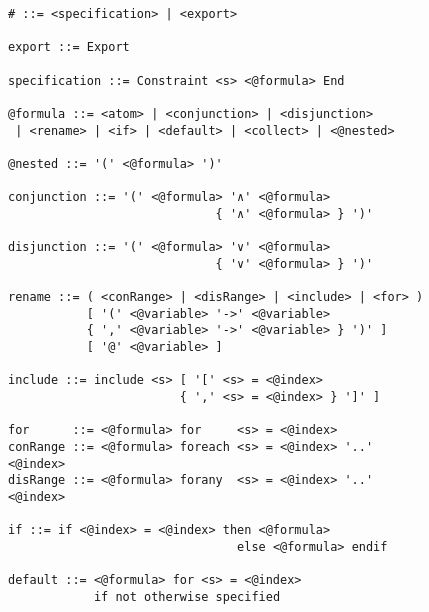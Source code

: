 \begin{figure}[h]
\begin{lstlisting}[language=BNF,basicstyle=\linespread{0.8}\ttfamily,
                   captionpos=t,caption=
   {Verbatim display of the grammar file that is used to generate the parser for
    CAnDL.
    The file is in a custom version of Backus–Naur form.
    In the parse tree, all expressions that start with ``{@}'' are
    automatically expanded.
    The character ``\#'' marks the top-level language construct.
    Any expression that does not ultimately become part of this construct
    constitutes a syntax error.\parfillskip=0pt}]
# ::= <specification> | <export>

export ::= Export

specification ::= Constraint <s> <@formula> End

@formula ::= <atom> | <conjunction> | <disjunction>
 | <rename> | <if> | <default> | <collect> | <@nested>

@nested ::= '(' <@formula> ')'

conjunction ::= '(' <@formula> '∧' <@formula>
                             { '∧' <@formula> } ')'

disjunction ::= '(' <@formula> '∨' <@formula>
                             { '∨' <@formula> } ')'

rename ::= ( <conRange> | <disRange> | <include> | <for> )
           [ '(' <@variable> '->' <@variable>
           { ',' <@variable> '->' <@variable> } ')' ]
           [ '@' <@variable> ]

include ::= include <s> [ '[' <s> = <@index>
                        { ',' <s> = <@index> } ']' ]

for      ::= <@formula> for     <s> = <@index>
conRange ::= <@formula> foreach <s> = <@index> '..' <@index>
disRange ::= <@formula> forany  <s> = <@index> '..' <@index>

if ::= if <@index> = <@index> then <@formula>
                                else <@formula> endif

default ::= <@formula> for <s> = <@index>
            if not otherwise specified
\end{lstlisting}
\end{figure}

